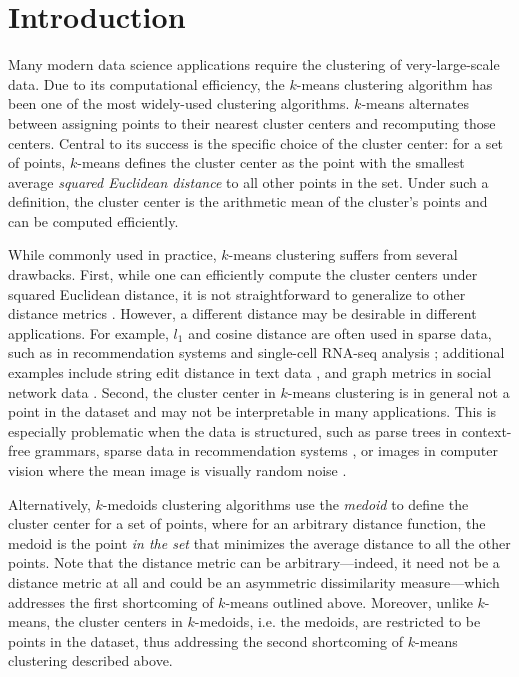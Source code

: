 
\section{Introduction \label{intro}}

Many modern data science applications require the clustering of very-large-scale data. 
Due to its computational efficiency, the $k$-means clustering algorithm \cite{macqueen1967some,lloyd1982least} has been one of the most widely-used clustering algorithms.
$k$-means alternates between assigning points to their nearest cluster centers and recomputing those centers. 
Central to its success is the specific choice of the cluster center: for a set of points, $k$-means defines the cluster center as the point with the smallest average \emph{squared Euclidean distance} to all other points in the set. 
Under such a definition, the cluster center is the arithmetic mean of the cluster's points and can be computed efficiently. 

While commonly used in practice, $k$-means clustering suffers from several drawbacks. 
First, while one can efficiently compute the cluster centers under squared Euclidean distance, it is not straightforward to generalize to other distance metrics \cite{overton1983quadratically,jain1988algorithms,bradley1997clustering}. 
However, a different distance may be desirable in different applications.
For example, $l_1$ and cosine distance are often used in sparse data, such as in recommendation systems \cite{leskovec2020mining} and single-cell RNA-seq analysis \cite{ntranos2016fast}; additional examples include string edit distance in text data \cite{navarro2001guided}, and graph metrics in social network data \cite{mishra2007clustering}. 
Second, the cluster center in $k$-means clustering is in general not a point in the dataset and may not be interpretable in many applications. This is especially problematic when the data is structured, such as parse trees in context-free grammars, sparse data in recommendation systems \cite{leskovec2020mining}, or images in computer vision where the mean image is visually random noise \cite{leskovec2020mining}. 

Alternatively, $k$-medoids clustering algorithms \cite{kaufman1987clustering,kaufman1990partitioning} use the \emph{medoid} to define the cluster center for a set of points, where for an arbitrary distance function, the medoid is the point \emph{in the set} that minimizes the average distance to all the other points.
Note that the distance metric can be arbitrary---indeed, it need not be a distance metric at all and could be an asymmetric dissimilarity measure---which addresses the first shortcoming of $k$-means outlined above.
Moreover, unlike $k$-means, the cluster centers in $k$-medoids, i.e. the medoids, are restricted to be points in the dataset, thus addressing the second shortcoming of $k$-means clustering described above.

